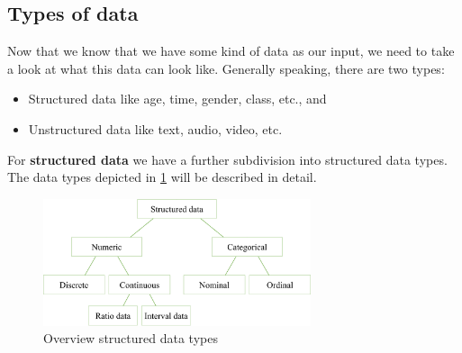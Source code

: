 \subsection{Types of data}
Now that we know that we have some kind of data as our input, we need to take a look at what this data can look like. Generally speaking, there are two types:
\begin{itemize}
  \item {}Structured data like age, time, gender, class, etc., and
  \item {}Unstructured data like text, audio, video, etc.
\end{itemize}

For \textbf{structured data} we have a further subdivision into structured data types. The data types depicted in \ref{fig:1_structured_data} will be described in detail.

\begin{figure}[H]
  \centering
  \includegraphics[width=0.7\textwidth]{assets/basics/structured_data.png}
  \caption{Overview structured data types}
  \label{fig:1_structured_data}
\end{figure}

